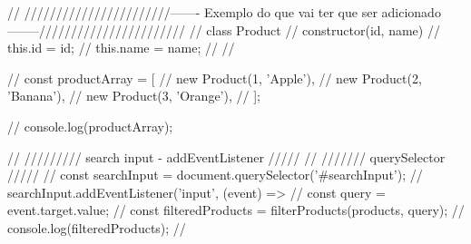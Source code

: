// ///////////////////////------- Exemplo do que vai ter que ser adicionado --------///////////////////////
// class Product {
//     constructor(id, name) {
//         this.id = id;
//         this.name = name;
//     }
// }

// const productArray = [
//     new Product(1, 'Apple'),
//     new Product(2, 'Banana'),
//     new Product(3, 'Orange'),
// ];

// console.log(productArray);


// ///////// search input - addEventListener /////
// /////// querySelector /////
// const searchInput = document.querySelector('#searchInput');
// searchInput.addEventListener('input', (event) => {
//     const query = event.target.value;
//     const filteredProducts = filterProducts(products, query);
//     console.log(filteredProducts);
// }